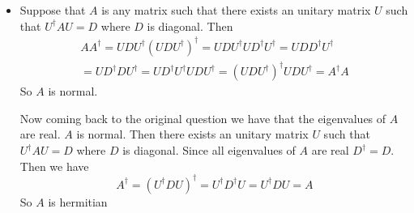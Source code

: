 \documentclass[a4paper, 11pt]{article}
\newtheorem{lemma}{Lemma}
\renewenvironment{proof}{\noindent{\it \textbf{Proof:}}\hspace*{1em}}{\qed\bigskip\\}
\begin{document}
{\begin{itemize}
\begin{lemma}\label{normdiag}
	 A matrix $A$ is diagonalizable with a unitary matrix if and only if $A$ is normal
\end{lemma}
	
	\begin{proof}
		 Let $A$ is normal. Then by Lemma 2 there  is a unitary matrix $U$ and a upper traingular matrix $T$ such that $A=UTU^{\dagger}$. Then \begin{multline*}
		TT^{\dagger}=U^{\dagger}AU(U^{\dagger}AU)^{\dagger}=U^{\dagger}AUU^{\dagger} A^{\dagger} U	=U^{\dagger}A A^{\dagger} U\\
	=U^{\dagger} A^{\dagger}A U=U^{\dagger} A^{\dagger}UU^{\dagger}A U=(U^{\dagger}AU)^{\dagger}U^{\dagger}AU=T^{\dagger}T
	\end{multline*}Now let $T=(t_{i,j})_{1\leq i,j\leq n}$. Then the first diagonal entry of $TT^{\dagger}$ is $$\sum_{i=1}^n  t_{1,i} \overline{t_{1,i}}=\sum_{i=1}^n |t_{1,i}|^2$$ Now the first diagonal entry of $T^{\dagger}T$ is $t_{1,1}\ov{t_{1,1}}=|t_{1,1}|^2$. These two are equal. Hence for all $2\leq i\leq n$ we have $t_{1,i}=0$. Similarly comparing the second diagonal entry of $TT^{\dagger} $ and $T^{\dagger}T$ we have that all the nondiagonal entries of second row of $T$ is 0.  Continuing like this we have that $T$ is diagonal. 
	\end{proof}
	
\item Suppose that $A$ is any matrix such that there exists an unitary matrix $U$ such that  $U^{\dagger}AU=D$ where $D$ is diagonal. Then \begin{multline*}
		AA^{\dagger}=UDU^{\dagger}(UDU^{\dagger})^{\dagger}=UDU^{\dagger}UD^{\dagger}U^{\dagger}=UDD^{\dagger}U^{\dagger}\\
		=UD^{\dagger}DU^{\dagger}=UD^{\dagger}U^{\dagger}UDU^{\dagger}=(UDU^{\dagger})^{\dagger}UDU^{\dagger}=A^{\dagger}A
	\end{multline*}So $A$ is normal.
	
	
	\parinn
	
	Now coming back to the original question we have that the eigenvalues of $A$ are real. $A$ is normal. Then  there exists an unitary matrix $U$ such that  $U^{\dagger}AU=D$ where $D$ is diagonal. Since all eigenvalues of $A$ are real $D^{\dagger}=D$. Then we have $$A^{\dagger}=(U^{\dagger}DU)^{\dagger}=U^{\dagger}D^{\dagger}U=U^{\dagger}DU=A$$So $A$ is hermitian
	
	\vspace{5mm}
	

\end{itemize}}
\end{document}
